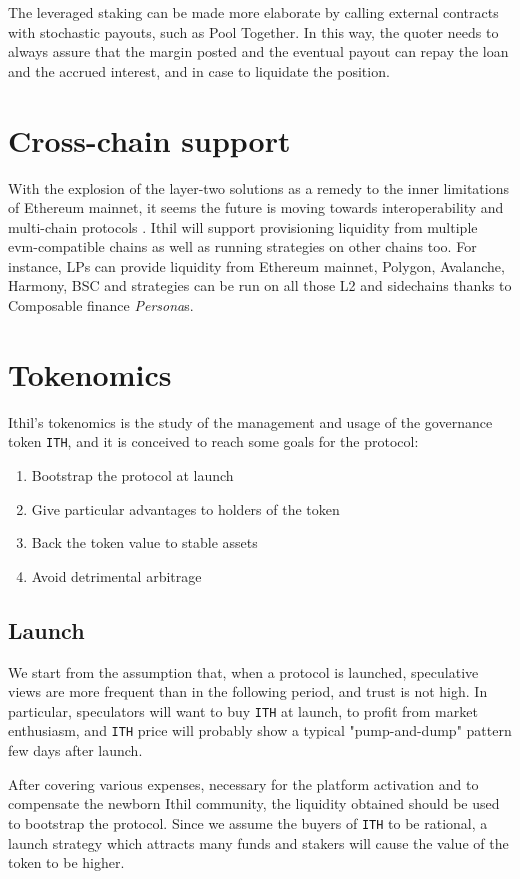 \documentclass[a4paper,10 pt]{article}
\theoremstyle{definition}
\begin{document}
The leveraged staking can be made more elaborate by calling external contracts with stochastic payouts, such as Pool Together. In this way, the quoter needs to always assure that the margin posted and the eventual payout can repay the loan and the accrued interest, and in case to liquidate the position.

\section{Cross-chain support}
With the explosion of the layer-two solutions as a remedy to the inner limitations of Ethereum mainnet, it seems the future is moving towards interoperability and multi-chain protocols \cite{stakedaoInterop}.
Ithil will support provisioning liquidity from multiple evm-compatible chains as well as running strategies on other chains too.
For instance, LPs can provide liquidity from Ethereum mainnet, Polygon, Avalanche, Harmony, BSC and strategies can be run on all those L2 and sidechains thanks to Composable finance \textit{Persona}s.


\section{Tokenomics}
Ithil's tokenomics is the study of the management and usage of the governance token \verb|ITH|, and it is conceived to reach some goals for the protocol:
\begin{enumerate}
\item Bootstrap the protocol at launch
\item Give particular advantages to holders of the token
\item Back the token value to stable assets
\item Avoid detrimental arbitrage
\end{enumerate}

\subsection{Launch}\label{launch}

We start from the assumption that, when a protocol is launched, speculative views are more frequent than in the following period, and trust is not high. In particular, speculators will want to buy \verb|ITH| at launch, to profit from market enthusiasm, and \verb|ITH| price will probably show a typical "pump-and-dump" pattern few days after launch.

After covering various expenses, necessary for the platform activation and to compensate the newborn Ithil community, the liquidity obtained should be used to bootstrap the protocol. Since we assume the buyers of \verb|ITH| to be rational, a launch strategy which attracts many funds and stakers will cause the value of the token to be higher.
\end{document}
